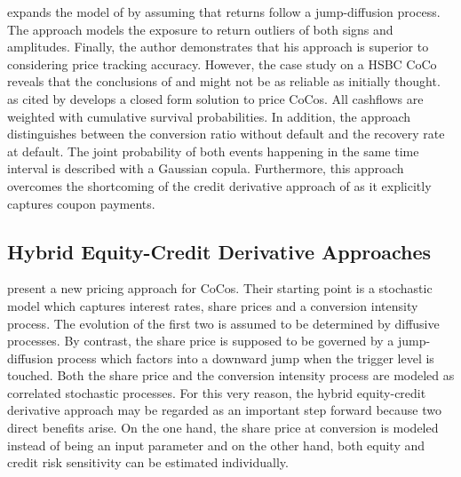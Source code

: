 \citet{erismann2015pricing} expands the model of \citet{de2011pricing} by assuming that returns follow a jump-diffusion process. The approach models the exposure to return outliers of both signs and amplitudes. Finally, the author demonstrates that his approach is superior to \citet{de2011pricing} considering price tracking accuracy. However, the case study on a HSBC CoCo reveals that the conclusions of \citet{erismann2015pricing} and \citet{wilkens2014contingent} might not be as reliable as initially thought.\\

\citet{serjantov2011hybrid} as cited by \citet{wilkens2014contingent} develops a closed form solution to price CoCos. All cashflows are weighted with cumulative survival probabilities. In addition, the approach distinguishes between the conversion ratio without default and the recovery rate at default. The joint probability of both events happening in the same time interval is described with a Gaussian copula. Furthermore, this approach overcomes the shortcoming of the credit derivative approach of \citet{de2011pricing} as it explicitly captures coupon payments.

\subsection*{Hybrid Equity-Credit Derivative Approaches}
\citet{turfus2015cocos} present a new pricing approach for CoCos. Their starting point is a stochastic model which captures interest rates, share prices and a conversion intensity process. The evolution of the first two is assumed to be determined by diffusive processes. By contrast, the share price is supposed to be governed by a jump-diffusion process which factors into a downward jump when the trigger level is touched. Both the share price and the conversion intensity process are modeled as correlated stochastic processes. For this very reason, the hybrid equity-credit derivative approach may be regarded as an important step forward because two direct benefits arise. On the one hand, the share price at conversion is modeled instead of being an input parameter and on the other hand, both equity and credit risk sensitivity can be estimated individually.  

